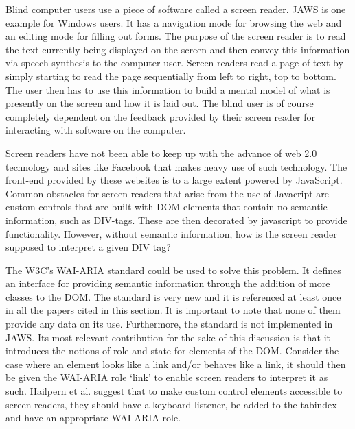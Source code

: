 \documentclass[conference]{IEEEtran}
\begin{document}
Blind computer users use a piece of software called a screen reader.
JAWS\cite{jaws} is one example for Windows users. It has a navigation mode for
browsing the web and an editing mode for filling out forms. The purpose of the
screen reader is to read the text currently being displayed on the screen and
then convey this information via speech synthesis to the computer user. Screen
readers read a page of text by simply starting to read the page sequentially
from left to right, top to bottom. The user then has to use this information to
build a mental model of what is presently on the screen and how it is laid out.
The blind user is of course completely dependent on the feedback provided by
their screen reader for interacting with software on the computer. 

Screen readers have not been able to keep up with the advance of web 2.0
technology and sites like Facebook that makes heavy use of such technology. The
front-end provided by these websites is to a large extent powered by
JavaScript.  Common obstacles for screen readers that arise from the use of
Javacript are custom controls\cite{ariaprimer} that are built with DOM-elements
that contain no semantic information, such as DIV-tags. These are then
decorated by javascript to provide functionality.  However, without semantic
information, how is the screen reader supposed to interpret a given DIV tag?  

The W3C’s WAI-ARIA standard\cite{ariaspec} could be used to solve this
problem\cite{ariaprimer}.  It defines an interface for providing semantic
information through the addition of more classes to the DOM.  The standard is
very new and it is referenced at least once in all the papers cited in this
section. It is important to note that none of them provide any data on its use.
Furthermore, the standard  is not implemented in JAWS\cite{hailpern2009}.  Its
most relevant contribution for the sake of this discussion is that it
introduces the notions of role and state for elements of the DOM.  Consider the
case where an element looks like a link and/or behaves like a link, it should
then be given the WAI-ARIA role `link' to enable screen readers to interpret it
as such.  Hailpern et al\cite{hailpern2009}.  suggest that to make custom control
elements accessible to screen readers, they should have a keyboard listener, be
added to the tabindex and have an appropriate WAI-ARIA role.
\end{document}
